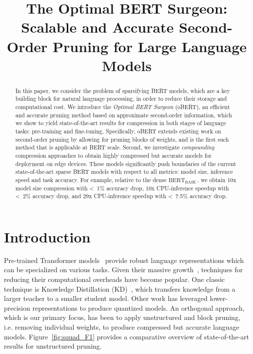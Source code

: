 \documentclass[11pt]{article}
\title{The Optimal BERT Surgeon: Scalable and Accurate Second-Order Pruning for Large Language Models\vspace{-0.4in}}
\newcommand{\bert}{$\textrm{BERT}_{\textrm{BASE}}\,$}
\begin{document}
\maketitle
\begin{abstract}
In this paper, we consider the problem of sparsifying BERT models, which are a key building block for natural language processing, in order to reduce their storage and computational cost. 
We introduce the \emph{Optimal BERT Surgeon} (oBERT), 
an efficient and accurate pruning method based on approximate second-order information, which we show to yield state-of-the-art results for compression in both stages of language tasks: pre-training and fine-tuning. Specifically, oBERT extends existing work on second-order pruning by allowing for pruning blocks of weights, and is the first such method that is applicable at BERT scale. 
Second, we investigate \emph{compounding} compression approaches to obtain highly compressed but accurate models for deployment on edge devices. These models significantly push boundaries of the current state-of-the-art sparse BERT models with respect to all metrics: model size, inference speed and task accuracy. For example, relative to the dense \bert, we obtain 10x model size compression with \hbox{< 1\%} accuracy drop, 10x CPU-inference speedup with \hbox{< 2\%} accuracy drop, and 29x CPU-inference speedup with \hbox{< 7.5\%} accuracy drop.

\end{abstract}
\section{Introduction} 

Pre-trained Transformer models~\cite{Vaswani2017AttentionIA, Devlin2019BERTPO} provide robust language representations which can be specialized on various tasks. Given their massive  growth~\cite{Radford2019LanguageMA, MTNLG}, techniques for reducing their computational overheads have become popular. One classic technique is Knowledge Distillation (KD)~\cite{Hinton2015DistillingTK}, which transfers knowledge from a larger teacher to a smaller student model. Other work has leveraged lower-precision representations to produce quantized models. An orthogonal approach, which is our primary focus, has been to apply unstructured and block pruning, i.e. removing individual weights, to produce compressed but accurate language models. \mbox{Figure~\ref{fig:squad_F1}} provides a comparative overview of state-of-the-art results for unstructured pruning.
\end{document}
